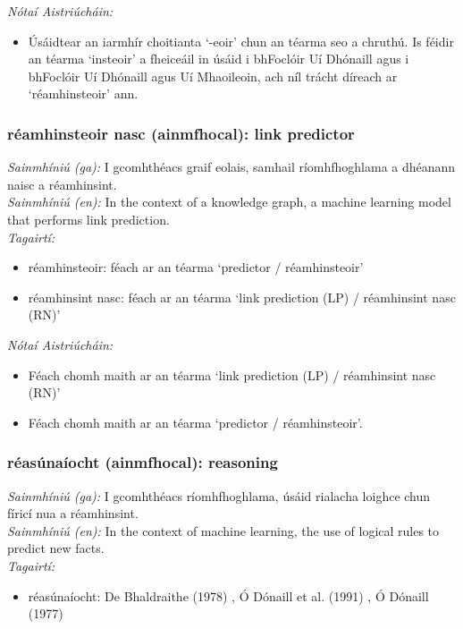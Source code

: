 \noindent \textit{Nótaí Aistriúcháin:}
\begin{itemize}
	\item Úsáidtear an iarmhír choitianta `-eoir' chun an téarma seo a chruthú. Is féidir an téarma `insteoir' a fheiceáil in úsáid i bhFoclóir Uí Dhónaill agus i bhFoclóir Uí Dhónaill agus Uí Mhaoileoin, ach níl trácht díreach ar `réamhinsteoir' ann.
\end{itemize}


\subsubsection*{réamhinsteoir nasc (ainmfhocal): link predictor}
 \noindent \textit{Sainmhíniú (ga):} I gcomhthéacs graif eolais, samhail ríomhfhoghlama a dhéanann naisc a réamhinsint.
\\
 \noindent \textit{Sainmhíniú (en):} In the context of a knowledge graph, a machine learning model that performs link prediction.
\\
 \noindent \textit{Tagairtí:}
\begin{itemize}
	\item réamhinsteoir: féach ar an téarma `predictor / réamhinsteoir'
	\item réamhinsint nasc: féach ar an téarma `link prediction (LP) / réamhinsint nasc (RN)'
\end{itemize}

 \noindent \textit{Nótaí Aistriúcháin:}
\begin{itemize}
	\item Féach chomh maith ar an téarma `link prediction (LP) / réamhinsint nasc (RN)'
	\item Féach chomh maith ar an téarma `predictor / réamhinsteoir'.
\end{itemize}


\subsubsection*{réasúnaíocht (ainmfhocal): reasoning}
 \noindent \textit{Sainmhíniú (ga):} I gcomhthéacs ríomhfhoghlama, úsáid rialacha loighce chun fíricí nua a réamhinsint.
\\
 \noindent \textit{Sainmhíniú (en):} In the context of machine learning, the use of logical rules to predict new facts.
\\
 \noindent \textit{Tagairtí:}
\begin{itemize}
	\item réasúnaíocht: De Bhaldraithe (1978) \cite{de-bhaldraithe}, Ó Dónaill et al. (1991) \cite{focloir-beag}, Ó Dónaill (1977) \cite{odonaill}
\end{itemize}

